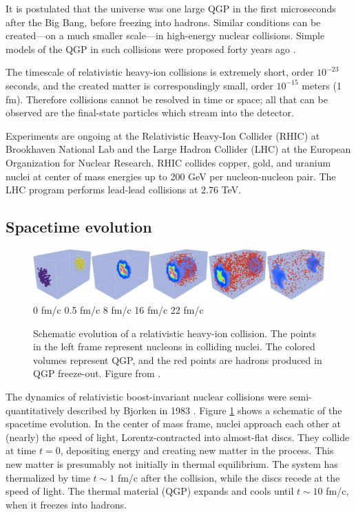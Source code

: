 \documentclass[reprint,amsmath]{revtex4-1}
\begin{document}
It is postulated that the universe was one large QGP in the first microseconds after the Big Bang, before freezing into hadrons.
Similar conditions can be created---on a much smaller scale---in high-energy nuclear collisions.  Simple models of the QGP in such
collisions were proposed forty years ago \cite{chapline}. 

The timescale of relativistic heavy-ion collisions is extremely short, order $10^{-23}$ seconds, and the created matter is correspondingly
small, order $10^{-15}$ meters (1 fm).  Therefore collisions cannot be resolved in time or space; all that can be observed are the
final-state particles which stream into the detector.

Experiments are ongoing at the Relativistic Heavy-Ion Collider (RHIC) at Brookhaven National Lab and the Large Hadron
Collider (LHC) at the European Organization for Nuclear Research.  RHIC collides copper, gold, and uranium nuclei at center of mass energies
up to 200 GeV per nucleon-nucleon pair.  The LHC program performs lead-lead collisions at 2.76 TeV.



\subsection{Spacetime evolution}

\begin{figure}[t]
  \centering
  \includegraphics[width=\textwidth]{evolution} \\
  0 fm/c   \hspace{.13\textwidth}
  0.5 fm/c \hspace{.13\textwidth}
  8 fm/c   \hspace{.13\textwidth}
  16 fm/c  \hspace{.13\textwidth}
  22 fm/c
  \caption{Schematic evolution of a relativistic heavy-ion collision.  The points in the left frame represent nucleons in colliding nuclei.
    The colored volumes represent QGP, and the red points are hadrons produced in QGP freeze-out.  Figure from \cite{iss}.}
  \label{fig:coll}
\end{figure}

The dynamics of relativistic boost-invariant nuclear collisions were semi-quantitatively described by Bjorken in 1983 \cite{bjorken}.
Figure \ref{fig:coll} shows a schematic of the spacetime evolution.  In the center of mass frame, nuclei approach each other at (nearly) the
speed of light, Lorentz-contracted into almost-flat discs.  They collide at time $t = 0$, depositing energy and creating new matter in the
process.  This new matter is presumably not initially in thermal equilibrium.  The system has thermalized by time $t \sim 1$ fm/c after the
collision, while the discs recede at the speed of light.  The thermal material (QGP) expands and cools until $t \sim 10$ fm/c, when it
freezes into hadrons.
\end{document}

